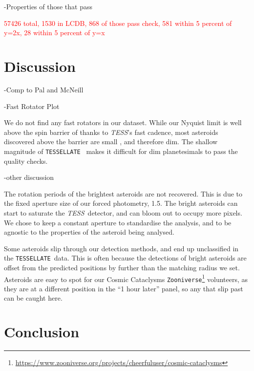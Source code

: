 \documentclass[12pt]{article}
\newcommand{\ttt}{\texttt}
\newcommand{\tess}{\textit{TESS}}
\newcommand{\tessellate}{\texttt{TESSELLATE}}
\newcommand{\red}[1]{\textcolor{red}{#1}}
\begin{document}
-Properties of those that pass


\red{57426 total, 1530 in LCDB, 868 of those pass check, 581 within 5 percent of y=2x, 28 within 5 percent of y=x}



\section{Discussion} \label{sec:Dis}

-Comp to Pal and McNeill

-Fast Rotator Plot

We do not find any fast rotators in our dataset.
While our Nyquist limit is well above the spin barrier of \citet{Pravec2000} thanks to \tess's fast cadence, most asteroids discovered above the barrier are small%
, and therefore dim.
The shallow magnitude of \tessellate\ \citep{TESSELLATE} makes it difficult for dim planetesimals to pass the quality checks.


-other discussion

The rotation periods of the brightest asteroids are not recovered.
This is due to the fixed aperture size of our forced photometry, \qty{1.5}{\px}.
The bright asteroids can start to saturate the \tess\ detector, and can bloom out to occupy more pixels.
We chose to keep a constant aperture to standardise the analysis, and to be agnostic to the properties of the asteroid being analysed.

Some asteroids slip through our detection methods, and end up unclassified in the \tessellate\ data.
This is often because the detections of bright asteroids are offset from the predicted positions by further than the matching radius we set.
Asteroids are easy to spot for our Cosmic Cataclysms \ttt{Zooniverse}\footnote{\url{https://www.zooniverse.org/projects/cheerfuluser/cosmic-cataclysms}} volunteers, as they are at a different position in the ``1 hour later'' panel, so any that slip past can be caught here.


\section{Conclusion}\label{sec:Conc}



\end{document}
